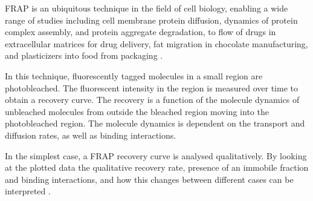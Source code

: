     FRAP is an ubiquitous technique in the field of cell biology,
    enabling a wide range of studies
    including cell membrane protein diffusion, dynamics of
    protein complex assembly, and protein aggregate degradation, to
    flow of drugs in extracellular matrices for drug delivery, fat
    migration in chocolate manufacturing, and plasticizers into food
    from packaging
    \citep{frap-review-2005,mcnally-frap-2010,frap-review-2015}.

    In this technique, fluorescently tagged molecules in a small region
    are photobleached.  The fluorescent intensity in the region is
    measured over time to obtain a recovery curve.  The recovery is a
    function of the molecule dynamics of unbleached
    molecules from outside the bleached region moving into the
    photobleached region.  The molecule dynamics is dependent on the
    transport and diffusion rates, as well as binding interactions.

    In the simplest case, a FRAP recovery curve is analysed
    qualitatively.  By looking at the plotted data the qualitative
    recovery rate, presence of an immobile
    fraction and binding interactions, and how this changes
    between different cases can be interpreted
    .


